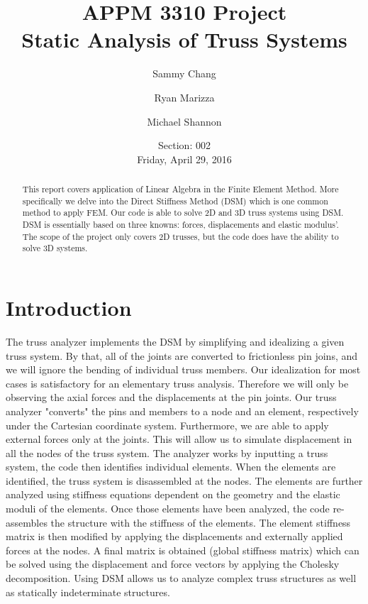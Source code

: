 \documentclass{article}
\title{APPM 3310 Project\\\Large{Static Analysis of Truss Systems}}
\author{Sammy Chang\and{}Ryan Marizza\and{}Michael Shannon}
\date{Section: 002\\\vspace{1em}Friday, April 29, 2016}
\begin{document}
\pagestyle{fancy}

\maketitle


\begin{abstract}
This report covers application of Linear Algebra in the Finite Element Method.
More specifically we delve into the Direct Stiffness Method (DSM) which is one
common method to apply FEM. Our code is able to solve 2D and 3D truss systems
using DSM. DSM is essentially based on three knowns: forces, displacements and
elastic modulus'. The scope of the project only covers 2D trusses, but the
code does have the ability to solve 3D systems.
\end{abstract}




\section{Introduction}
The truss analyzer implements the DSM by simplifying and idealizing a given
truss system. By that, all of the joints are converted to frictionless pin
joins, and we will ignore the bending of individual truss members. Our
idealization for most cases is satisfactory for an elementary truss analysis.
Therefore we will only be observing the axial forces and the displacements at
the pin joints. Our truss analyzer "converts" the pins and members to a node
and an element, respectively under the Cartesian coordinate system.
Furthermore, we are able to apply external forces only at the joints. This
will allow us to simulate displacement in all the nodes of the truss system.
The analyzer works by inputting a truss system, the code then identifies
individual elements. When the elements are identified, the truss system is
disassembled at the nodes. The elements are further analyzed using stiffness
equations dependent on the geometry and the elastic moduli of the elements.
Once those elements have been analyzed, the code re-assembles the structure
with the stiffness of the elements. The element stiffness matrix is then
modified by applying the displacements and externally applied forces at the
nodes. A final matrix is obtained (global stiffness matrix) which can be
solved using the displacement and force vectors by applying the Cholesky
decomposition. Using DSM allows us to analyze complex truss structures as well
as statically indeterminate structures.
\end{document}
